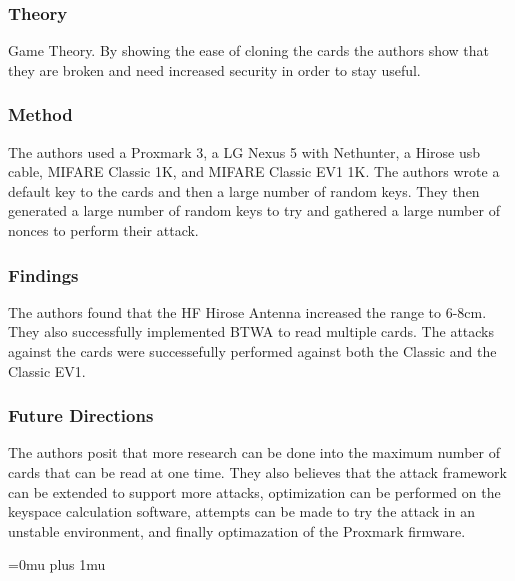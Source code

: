 \subsubsection{Theory}

\noindent
Game Theory.  By showing the ease of cloning the cards the authors show that they are broken and need increased security in order to stay useful.

\subsubsection{Method}

\noindent
The authors used a Proxmark 3, a LG Nexus 5 with Nethunter, a Hirose usb cable, MIFARE Classic 1K, and MIFARE Classic EV1 1K.  The authors wrote a default key to the cards and then a large number of random keys.  They then generated a large number of random keys to try and gathered a large number of nonces to perform their attack.

\subsubsection{Findings}

\noindent
The authors found that the HF Hirose Antenna increased the range to 6-8cm.  They also successfully implemented BTWA to read multiple cards.  The attacks against the cards were successefully performed against both the Classic and the Classic EV1.

\subsubsection{Future Directions}

\noindent
The authors posit that more research can be done into the maximum number of cards that can be read at one time.  They also believes that the attack framework can be extended to support more attacks, optimization can be performed on the keyspace calculation software, attempts can be made to try the attack in an unstable environment, and finally optimazation of the Proxmark firmware.

\Urlmuskip=0mu plus 1mu\relax
\pagebreak 
